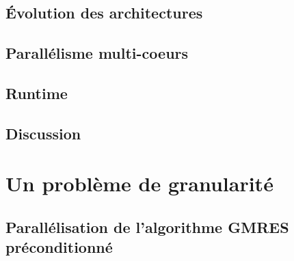 \documentclass[twoside,11pt]{classes/Thesis}
\begin{document}
\section{\'Evolution des architectures}





%



\section{Parallélisme multi-coeurs}






\section{Runtime}





\section{Discussion}



\chapter{Un problème de granularité}
\minitoc
\vspace{1cm}


\section{Parallélisation de l'algorithme GMRES préconditionné}


\end{document}
